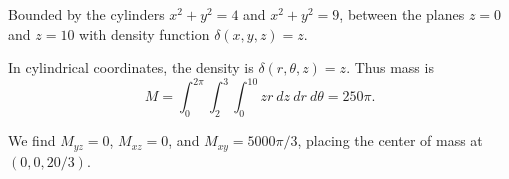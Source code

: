 {
Bounded by the cylinders $x^2+y^2=4$ and $x^2+y^2=9$, between the planes $z=0$ and $z=10$ with density function $\delta(x,y,z) =z$. 
}
{In cylindrical coordinates, the density is $\delta(r,\theta,z) = z$. Thus mass is
$$M=\int_0^{2\pi}\int_2^3\int_0^{10} zr\ dz\ dr\ d\theta = 250\pi.$$

We find $M_{yz} = 0$, $M_{xz} = 0$, and $M_{xy} = 5000\pi/3$, placing the center of mass at $(0,0,20/3)$.
}
